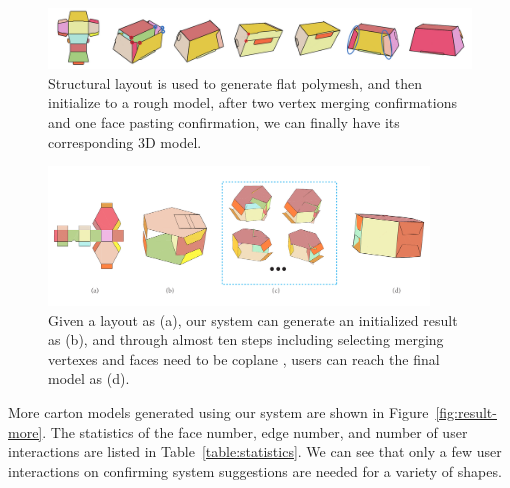 \begin{figure}
	\centering
	\includegraphics[width=\textwidth]{images/105}
	\caption{Structural layout is used to generate flat polymesh, and then initialize to a rough model, after two vertex merging confirmations and one face pasting confirmation, we can finally have its corresponding 3D model.}
	\label{fig:result}
\end{figure}




\begin{figure}
	\centering
	\includegraphics[width=0.9\textwidth]{images/limitation}
	\caption{Given a layout as (a), our system can generate an initialized result as (b), and through almost ten steps including selecting merging vertexes and faces need to be coplane , users can reach the final model as (d). }
	\label{fig:hexagon}
\end{figure}




More carton models generated using our system are shown in Figure~\ref{fig:result-more}.
%
The statistics of the face number, edge number, and number of user interactions are listed in Table~\ref{table:statistics}. 
We can see that only a few user interactions on confirming system suggestions are needed for a variety of shapes.


